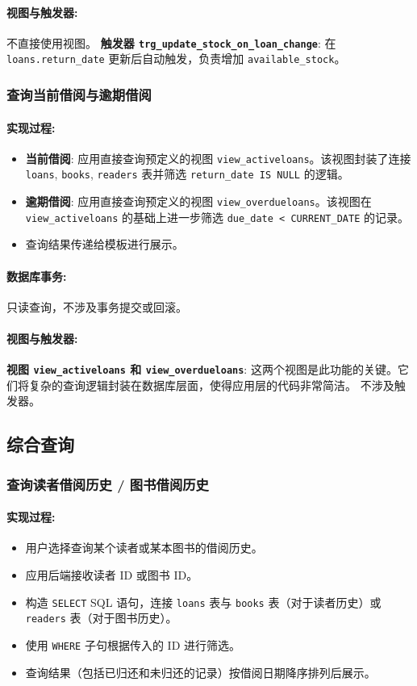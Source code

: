\documentclass[11pt, a4paper]{article}
\begin{document}
\paragraph{视图与触发器:}
不直接使用视图。
\textbf{触发器 \texttt{trg\_update\_stock\_on\_loan\_change}}: 在 \texttt{loans.return\_date} 更新后自动触发，负责增加 \texttt{available\_stock}。

\subsubsection{查询当前借阅与逾期借阅}
\paragraph{实现过程:}
\begin{itemize}
    \item \textbf{当前借阅}: 应用直接查询预定义的视图 \texttt{view\_activeloans}。该视图封装了连接 \texttt{loans}, \texttt{books}, \texttt{readers} 表并筛选 \texttt{return\_date IS NULL} 的逻辑。
    \item \textbf{逾期借阅}: 应用直接查询预定义的视图 \texttt{view\_overdueloans}。该视图在 \texttt{view\_activeloans} 的基础上进一步筛选 \texttt{due\_date < CURRENT\_DATE} 的记录。
    \item 查询结果传递给模板进行展示。
\end{itemize}
\paragraph{数据库事务:}
只读查询，不涉及事务提交或回滚。
\paragraph{视图与触发器:}
\textbf{视图 \texttt{view\_activeloans} 和 \texttt{view\_overdueloans}}: 这两个视图是此功能的关键。它们将复杂的查询逻辑封装在数据库层面，使得应用层的代码非常简洁。
不涉及触发器。

\subsection{综合查询}

\subsubsection{查询读者借阅历史 / 图书借阅历史}
\paragraph{实现过程:}
\begin{itemize}
    \item 用户选择查询某个读者或某本图书的借阅历史。
    \item 应用后端接收读者 ID 或图书 ID。
    \item 构造 \texttt{SELECT} SQL 语句，连接 \texttt{loans} 表与 \texttt{books} 表（对于读者历史）或 \texttt{readers} 表（对于图书历史）。
    \item 使用 \texttt{WHERE} 子句根据传入的 ID 进行筛选。
    \item 查询结果（包括已归还和未归还的记录）按借阅日期降序排列后展示。
\end{itemize}
\end{document}
